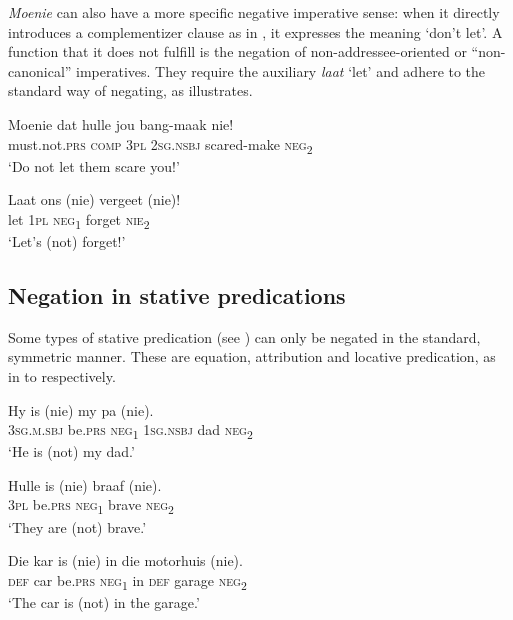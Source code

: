 \documentclass[output=paper,colorlinks,citecolor=brown]{langscibook}
\begin{document}
\textit{Moenie} can also have a more specific negative imperative sense: when it directly introduces a complementizer clause as in , it expresses the meaning ‘don’t let’. A function that it does not fulfill is the negation of non-addressee-oriented or “non-canonical” \citep[47]{Aikhenvald2010} imperatives. They require the auxiliary \textit{laat} ‘let’ and adhere to the standard way of negating, as  illustrates.

\ea\label{ex:afr:13}
    \ea\label{ex:afr:13a}
        \gll Moenie dat hulle jou bang-maak nie! \\ 
             must.not.\textsc{prs} \textsc{comp} \textsc{3pl} \textsc{2sg.nsbj} scared-make \textsc{neg}\textsubscript{2} \\
        \glt ‘Do not let them scare you!’
    
    \ex\label{ex:afr:13b}
        \gll Laat ons (nie) vergeet (nie)! \\
             let \textsc{1pl} \textsc{neg}\textsubscript{1} forget \textsc{nie}\textsubscript{2}\\
        \glt ‘Let’s (not) forget!’
    \z
\z 

\subsection{Negation in stative predications}
\label{sec:afr:2.3}
Some types of stative predication (see \citealt[1386--1389]{Veselinova2014}) can only be negated in the standard, symmetric manner. These are equation, attribution and locative predication, as in  to  respectively.

\ea\label{ex:afr:14}
    \ea\label{ex:afr:14a}
        \gll Hy is (nie) my pa (nie). \\ 
             \textsc{3sg.m.sbj}  be.\textsc{prs} \textsc{neg}\textsubscript{1} \textsc{1sg.nsbj} dad  \textsc{neg}\textsubscript{2} \\
        \glt ‘He is (not) my dad.’
    
    \ex\label{ex:afr:14b}
        \gll Hulle is (nie) braaf (nie). \\
             \textsc{3pl} be.\textsc{prs} \textsc{neg}\textsubscript{1} brave    \textsc{neg}\textsubscript{2}\\
        \glt ‘They are (not) brave.’

    \ex\label{ex:afr:14c}
        \gll Die kar is (nie) in die motorhuis (nie). \\
             \textsc{def} car  be.\textsc{prs} \textsc{neg}\textsubscript{1} in  \textsc{def} garage \textsc{neg}\textsubscript{2}\\
        \glt ‘The car is (not) in the garage.’
    \z
\z 
\end{document}

